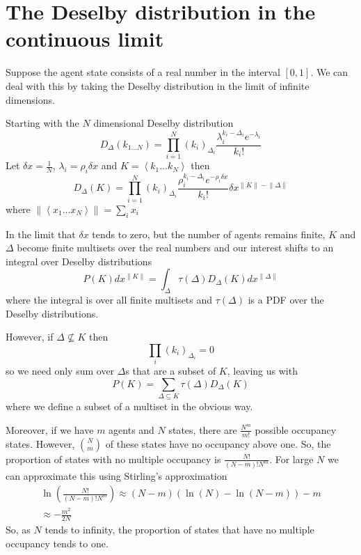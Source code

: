 \documentclass[letterpaper,twocolumn,10pt]{article}
\begin{document}
\section{The Deselby distribution in the continuous limit}

Suppose the agent state consists of a real number in the interval $[0,1]$. We can deal with this by taking the Deselby distribution in the limit of infinite dimensions.

Starting with the $N$ dimensional Deselby distribution
\[
D_\Delta(k_{1...N}) = \prod_{i=1}^N (k_i)_{\Delta_i}\frac{\lambda_i^{k_i-\Delta_i}e^{-\lambda_i}}{k_i!}
\]
Let $\delta x = \frac{1}{N}$, $\lambda_i = \rho_i \delta x$  and $K = \left< k_1...k_N \right>$ then
\begin{equation}
D_\Delta(K) = \prod_{i=1}^N (k_i)_{\Delta_i}\frac{\rho_i^{k_i-\Delta_i}e^{-\rho_i \delta x}}{k_i!} \delta x^{\lVert K\rVert - \lVert \Delta \rVert}
\label{continuousDeselby}
\end{equation}
where $\lVert \left<x_1...x_N \right> \rVert = \sum_i x_i$

In the limit that $\delta x$ tends to zero, but the number of agents remains finite, $K$ and $\Delta$ become finite multisets over the real numbers and our interest shifts to an integral over Deselby distributions
\[
P(K) dx^{\lVert K \rVert} = \int_\Delta \tau(\Delta) D_\Delta(K) dx^{\lVert\Delta \rVert}
\]
where the integral is over all finite multisets and $\tau(\Delta)$ is a PDF over the Deselby distributions.

However, if $\Delta \not\subseteq K$ then
\[
\prod_i(k_i)_{\Delta_i} = 0 
\]
so we need only sum over $\Delta$s that are a subset of $K$, leaving us with
\[
P(K) = \sum_{\Delta\subseteq K} \tau(\Delta) D_\Delta(K)
\]
where we define a subset of a multiset in the obvious way.

Moreover, if we have $m$ agents and $N$ states, there are $\frac{N^m}{m!}$ possible occupancy states. However, ${N \choose m}$ of these states have no occupancy above one. So, the proportion of states with no multiple occupancy is $\frac{N!}{(N-m)!N^m}$. For large $N$ we can approximate this using Stirling's approximation
\[
\begin{split}
\ln\left(\frac{N!}{(N-m)!N^m}\right) 
\approx (N-m)(\ln(N) - \ln(N-m)) - m \\
\approx -\frac{m^2}{2N}
\end{split}
\]
So, as $N$ tends to infinity, the proportion of states that have no multiple occupancy tends to one.
\end{document}
